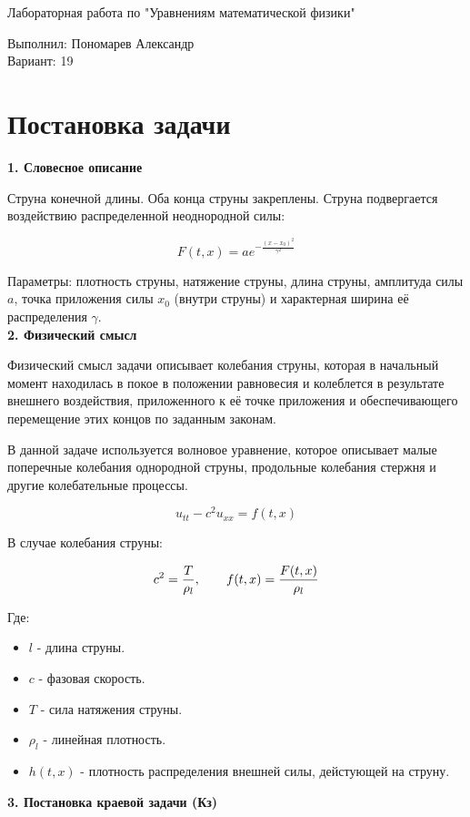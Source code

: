 \documentclass[a4paper]{article}
\begin{document}
\begin{center}
    \Large Лабораторная работа по "Уравнениям математической физики" \\
\end{center}

\begin{center}
Выполнил: Пономарев Александр \\
Вариант: 19 \\

\end{center}

\section{Постановка задачи}

\textbf{1. Словесное описание}

Струна конечной длины. Оба конца струны закреплены. Струна подвергается
воздействию распределенной неоднородной силы:

$$
    F(t, x) = ae^{-\frac{(x-x_0)^2}{\gamma^2}}
$$

Параметры:
    плотность струны,
    натяжение струны,
    длина струны,
    амплитуда силы $ a $,
    точка приложения силы $ x_0 $ (внутри струны)
    и характерная ширина её распределения $ \gamma $. \\
\textbf{2. Физический смысл}

Физический смысл задачи описывает колебания струны, которая в начальный момент находилась в покое в положении равновесия и колеблется в результате внешнего воздействия, приложенного к её точке приложения и обеспечивающего перемещение этих концов по заданным законам.

В данной задаче используется волновое уравнение, которое описывает малые поперечные колебания однородной струны, продольные колебания стержня и другие колебательные процессы.

$$u_{tt}-c^2u_{xx}=f(t,x)$$

В случае колебания струны:

$$c^2={T\over \rho_l}, \qquad f(t,x)={F(t,x)\over \rho_l}$$

Где:
\begin{itemize}
    \item $ l $ - длина струны.
    \item $ c $ - фазовая скорость.
    \item $ T $ - сила натяжения струны.
    \item $ \rho_l $ - линейная плотность.
    \item $ h(t,x) $ - плотность распределения внешней силы, дейстующей на струну.
\end{itemize}
\textbf{3. Постановка краевой задачи (Кз)}
\end{document}
